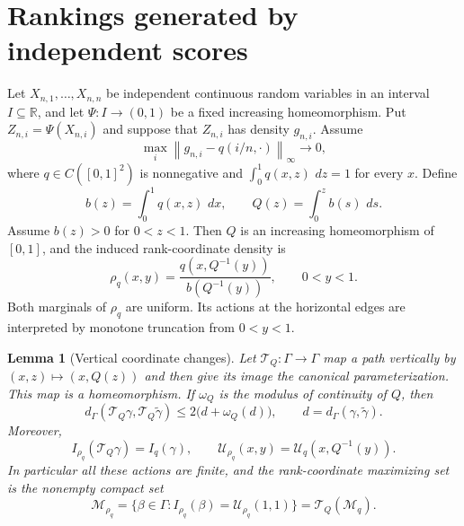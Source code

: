 \documentclass[11pt]{article}
\newtheorem{lemma}[theorem]{Lemma}
\theoremstyle{remark}
\newcommand{\Rr}{\mathbb R}
\newcommand{\dd}{\,d}
\newcommand{\calU}{\mathcal U}
\newcommand{\norm}[1]{\left\lVert #1\right\rVert}
\begin{document}
\section{Rankings generated by independent scores}
\label{sec:independent-scores}

Let $X_{n,1},\dots,X_{n,n}$ be independent continuous random variables in
an interval $I\subseteq\Rr$, and let $\Psi:I\to(0,1)$ be a fixed
increasing homeomorphism.  Put $Z_{n,i}=\Psi(X_{n,i})$ and suppose that
$Z_{n,i}$ has density $g_{n,i}$.  Assume
\begin{equation}\label{eq:score-density-hyp}
 \max_i\norm{g_{n,i}-q(i/n,\cdot)}_\infty\longrightarrow0,
\end{equation}
where $q\in C([0,1]^2)$ is nonnegative and
$\int_0^1q(x,z)\,\dd z=1$ for every $x$.  Define
\begin{equation}\label{eq:mixture-cdf}
 b(z)=\int_0^1q(x,z)\,\dd x,
 \qquad Q(z)=\int_0^zb(s)\,\dd s.
\end{equation}
Assume $b(z)>0$ for $0<z<1$.  Then $Q$ is an increasing homeomorphism of
$[0,1]$, and the induced rank-coordinate density is
\begin{equation}\label{eq:score-permuton-density}
 \rho_q(x,y)
 =\frac{q(x,Q^{-1}(y))}{b(Q^{-1}(y))},
 \qquad 0<y<1.
\end{equation}
Both marginals of $\rho_q$ are uniform.  Its actions at the horizontal
edges are interpreted by monotone truncation from $0<y<1$.

\begin{lemma}[Vertical coordinate changes]\label{lem:vertical-path-map}
Let $\mathcal T_Q:\Gamma\to\Gamma$ map a path vertically by
$(x,z)\mapsto(x,Q(z))$ and then give its image the canonical
parameterization.  This map is a homeomorphism.  If
$\omega_Q$ is the modulus of continuity of $Q$, then
\begin{equation}\label{eq:vertical-path-continuity}
 d_\Gamma(\mathcal T_Q\gamma,\mathcal T_Q\widetilde\gamma)
 \le2\bigl(d+\omega_Q(d)\bigr),
 \qquad d=d_\Gamma(\gamma,\widetilde\gamma).
\end{equation}
Moreover,
\begin{equation}\label{eq:score-action-invariance}
 I_{\rho_q}(\mathcal T_Q\gamma)=I_q(\gamma),
 \qquad
 \calU_{\rho_q}(x,y)=\calU_q(x,Q^{-1}(y)).
\end{equation}
In particular all these actions are finite, and the rank-coordinate
maximizing set is the nonempty compact set
\begin{equation}\label{eq:score-maximizer-map}
 \mathscr M_{\rho_q}
 =\{\beta\in\Gamma:I_{\rho_q}(\beta)=\calU_{\rho_q}(1,1)\}
 =\mathcal T_Q(\mathscr M_q).
\end{equation}
\end{lemma}
\end{document}
